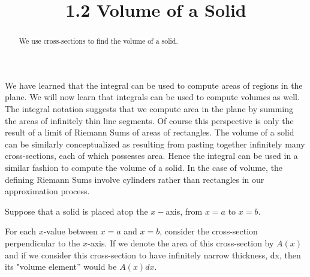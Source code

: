 \documentclass{ximera}
\title{1.2 Volume of a Solid}
\begin{document}
\begin{abstract}
We use cross-sections to find the volume of a solid.
\end{abstract}

\maketitle


We have learned that the integral can be used to compute areas of regions in the plane.  
We will now learn that integrals can be used to compute volumes as well.
The integral notation suggests that we compute area in the plane by summing the areas of  infinitely thin line segments.
Of course this perspective is only the result of a limit of Riemann Sums of areas of rectangles.
The volume of a solid can be similarly conceptualized as resulting from pasting together infinitely many cross-sections,
each of which possesses area. Hence the integral can be used in a similar fashion to compute the volume of a solid.
In the case of volume, the defining Riemann Sums involve cylinders rather than rectangles
in our approximation process.



Suppose that a solid is placed atop the $x-$axis, from $x = a$ to $x = b$.


For each $x$-value between $x = a$ and $x = b$,  consider the cross-section perpendicular to the $x$-axis. If we denote the area of this cross-section by 
 $A(x)$ and if we consider this cross-section to have infinitely narrow thickness, dx, then its "volume element'' would be $A(x) dx$.
\end{document}
